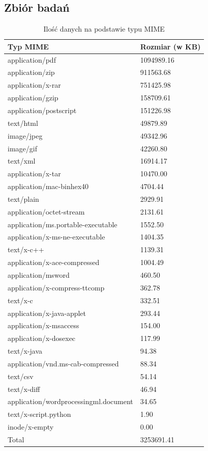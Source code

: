 \subsection{Zbiór badań}
\begin{table}[h]
    \centering
    \begin{tabular}{|l|l|}
        \hline
        \textbf{Typ MIME} & \textbf{Rozmiar (w KB)}\\
        \hline
application/pdf & 1094989.16  \\
application/zip & 911563.68 \\
application/x-rar & 751425.98 \\
application/gzip & 158709.61  \\
application/postscript & 151226.98 \\
text/html & 49879.89  \\
image/jpeg & 49342.96  \\
image/gif & 42260.80  \\
text/xml & 16914.17  \\
application/x-tar & 10470.00  \\
application/mac-binhex40 & 4704.44 \\
text/plain & 2929.91  \\
application/octet-stream & 2131.61 \\
application/ms.portable-executable & 1552.50  \\
application/x-ms-ne-executable & 1404.35 \\
text/x-c++ & 1139.31\\
application/x-ace-compressed & 1004.49 \\
application/msword & 460.50\\
application/x-compress-ttcomp & 362.78  \\
text/x-c & 332.51  \\
application/x-java-applet & 293.44  \\
application/x-msaccess & 154.00 \\
application/x-dosexec & 117.99 \\
text/x-java & 94.38  \\
application/vnd.ms-cab-compressed & 88.34  \\
text/csv & 54.14  \\
text/x-diff & 46.94 \\
application/wordprocessingml.document & 34.65 \\
text/x-script.python & 1.90 \\
inode/x-empty & 0.00  \\
\hline
Total & 3253691.41  \\
        \hline
    \end{tabular}
    \caption{Ilość danych na podstawie typu MIME}
    \label{tabela:typy-MIME-z-iloscia}
\end{table}
